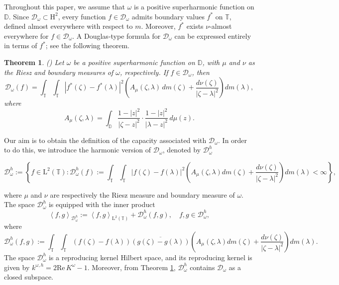 \documentclass[12pt,reqno,a4paper]{amsart}
\newtheorem{theo}[prop]{Theorem}
\renewcommand{\Re}{\mathrm{Re }}
\newcommand{\IL}{\mathrm{L^2(\TT)}}
\newcommand\TT{\mathbb{T}}
\newcommand\DD{\mathbb{D}}
\newcommand{\cD}{{\mathcal{D}}}
\numberwithin{equation}{section}
\begin{document}
	Throughout this paper, we assume that $\omega$ is a positive superharmonic function on $\DD$.
	Since $\mathcal{D}_\omega \subset \mathrm{H}^2$, every function $f \in \mathcal{D}_\omega$
	admits boundary values $f^*$ on $\mathbb{T}$, defined almost everywhere with respect to $m$.
	Moreover, $f^*$ exists $\nu$-almost everywhere for $f \in \mathcal{D}_\omega$. A Douglas-type formula for $\mathcal{D}_\omega$
	can be expressed entirely in terms of $f^*$; see the following theorem.
	\begin{theo}{(\cite{BGP18,RS1})} \label{douglas}
		Let \(\omega\) be a positive superharmonic function on \(\mathbb{D}\), with \(\mu\) and \(\nu\) as the Riesz and boundary measures of \(\omega\), respectively. If \(f \in \cD_\omega\), then
		\[
		\cD_\omega(f) = \int_{\mathbb{T}} \int_{\mathbb{T}} |f^*(\zeta) - f^*(\lambda)|^2 \left( A_\mu(\zeta, \lambda) \, dm(\zeta) + \frac{d\nu(\zeta)}{|\zeta - \lambda|^2} \right) dm(\lambda),
		\]
		where 
		\[
		A_\mu(\zeta, \lambda) = \int_{\mathbb{D}} \frac{1 - |z|^2}{|\zeta - z|^2} \cdot \frac{1 - |z|^2}{|\lambda - z|^2} \, d\mu(z).
		\]
	\end{theo}	
	Our aim is to obtain the definition of the capacity associated with $\cD_\omega$. In order to do this, we introduce the harmonic version of $\cD_\omega$, denoted by $\cD_\omega^h$
	\begin{small}$$
		\cD_\omega^h:=\left\{f\in\IL:\cD_\omega^h(f):=\int_{\TT}\int_{\TT}|f(\zeta)-f(\lambda)|^2\left(A_\mu(\zeta,\lambda)dm(\zeta)+\frac{d\nu(\zeta)}{|\zeta-\lambda|^2}\right)dm(\lambda)<\infty\right\},
		$$\end{small}
	where $\mu$ and $\nu$ are respectively the Riesz measure and boundary measure of $\omega$. The space $\cD_\omega^h$ is equipped with the inner product 
	$$
	\left<f,g\right>_{\cD_\omega^h}:=\left<f,g\right>_{\IL}+\cD_\omega^h(f,g), \quad f,g\in\cD_\omega^h,
	$$
	where 
	$$
	\cD_\omega^h(f,g):=\int_{\TT}\int_{\TT}\left(f(\zeta)-f(\lambda)\right)\overline{\left(g(\zeta)-g(\lambda)\right)}\left(A_\mu(\zeta,\lambda)dm(\zeta)+\frac{d\nu(\zeta)}{|\zeta-\lambda|^2}\right)dm(\lambda).
	$$
	The space $\cD_\omega^h$ is a reproducing kernel Hilbert space, and its reproducing kernel is given by
	\(
	k^{\omega,h} = 2\Re\, K^\omega - 1.
	\) Moreover, from Theorem \ref{douglas}, $\cD_\omega^h$ contains $\cD_\omega$ as a closed subspace. 
	
\end{document}
